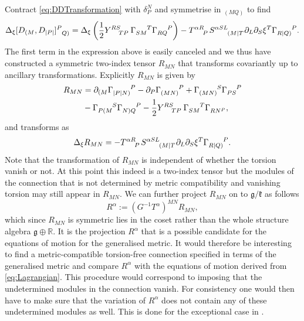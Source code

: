Contract \eqref{eq:DDTransformation} with $\delta^N_P$ and symmetrise in $_{(MQ)}$ to find 
\begin{equation}
    \Delta_\xi [D_{(M},D_{|P|}]\tensor{}{^P_{Q)}} = \Delta_\xi \left(\frac{1}{2}\tensor{Y}{^{RS}_{TP}}\tensor{\Gamma}{_{SM}^T}\tensor{\Gamma}{_{RQ}^P}\right)-\tensor{T}{^{\alpha R}_P}\tensor{S}{^{\alpha SL}_{(M|T}}\pd_L\pd_S\xi^T\tensor{\Gamma}{_{R|Q)}^P}.
\end{equation}
The first term in the expression above is easily canceled and we thus have constructed a symmetric two-index tensor $R_{MN}$ that transforms covariantly up to ancillary transformations. Explicitly $R_{MN}$ is given by 
\begin{equation}
    \begin{aligned}
        R_{MN} &= \pd_{(M}\tensor{\Gamma}{_{|P|N)}^P}-\pd_P\tensor{\Gamma}{_{(MN)}^P}+\tensor{\Gamma}{_{(MN)}^S}\tensor{\Gamma}{_{PS}^P}\\
        &-\tensor{\Gamma}{_{P(M}^S}\tensor{\Gamma}{_{N)Q}^P}-\frac{1}{2}\tensor{Y}{^{RS}_{TP}}\tensor{\Gamma}{_{SM}^T}\tensor{\Gamma}{_{RN^P}},
    \end{aligned}
\end{equation}
and transforms as 
\begin{equation}
    \Delta_\xi R_{MN} = -\tensor{T}{^{\alpha R}_P}\tensor{S}{^{\alpha SL}_{(M|T}}\pd_L\pd_S\xi^T\tensor{\Gamma}{_{R|Q)}^P}.
\end{equation}
Note that the transformation of $R_{MN}$ is independent of whether the torsion vanish or not. At this point this indeed is a two-index tensor but the modules of the connection that is not determined by metric compatibility and vanishing torsion may still appear in $R_{MN}$. We can further project $R_{MN}$ on to $\mathfrak{g}/\mathfrak{k}$ as follows 
\begin{equation}
    R^\alpha := (G^{-1}T^\alpha)^{MN}R_{MN},
\end{equation}
which since $R_{MN}$ is symmetric lies in the coset rather than the whole structure algebra $\mathfrak{g}\oplus\mathbb{R}$. It is the projection $R^\alpha$ that is a possible candidate for the equations of motion for the generalised metric. It would therefore be interesting to find a metric-compatible torsion-free connection specified in terms of the generalised metric and compare $R^\alpha$ with the equations of motion derived from \eqref{eq:Lagrangian}. This procedure would correspond to imposing that the undetermined modules in the connection vanish. For consistency one would then have to make sure that the variation of $R^\alpha$ does not contain any of these undetermined modules as well. This is done for the exceptional case in \cite{Cederwall:2013naa}.

